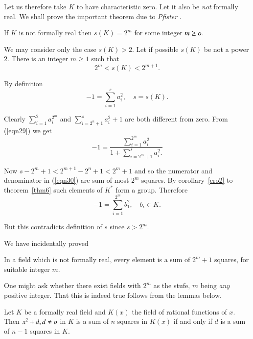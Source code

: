 Let us therefore take $K$ to have characteristic zero. Let it also be
\textit{not} formally real. We shall prove the important theorem due
to \textit{Pfister} \cite{key14}.

\begin{thnm}\label{thnm7}
If $K$ is not formally real then $s(K)=2^{m}$ for some integer $m\geq o$.
\end{thnm}


\begin{Proof}
We may consider only the case $s(K)>2$. Let if possible $s(K)$ be not
a power $2$. There is an integer $m\geq 1$ such that 
$$
2^{m}<s(K)<2^{m+1}.
$$

By definition
\begin{equation}\label{eqn29}
-1=\sum\limits_{i=1}^{s}a^{2}_i,\quad s=s(K).
\end{equation}

Clearly $\sum\limits_{i=1}^{2}a^{2^{m}}_i$ and
$\sum\limits_{i=2^{n}+1}^{s} a^{2}_i+1$ are both different from
zero. From (\ref{eqn29}) we get
\begin{equation}\label{eqn30}
-1=\dfrac{\sum\limits_{i=1}^{2^{m}}a^{2}_i}{1+\sum\limits_{i=2^{m}+1}^{s}a^{2}_i.}
\end{equation}

Now $s-2^{m}+1<2^{m+1}-2^{n}+1<2^{m}+1$ and so the numerator and
denominator in (\ref{eqn30}) are sum of most $2^{m}$ squares. By
corollary~\ref{cro2}  to theorem~\ref{thm6} such elements of $K^{\ast}$ form
a group. Therefore
$$
-1=\sum\limits_{i=1}^{2^{m}}b^{2}_1,\quad b_i\in K.
$$

But this contradicts definition of $s$ since $s>2^{m}$.

We have incidentally proved 
\enprf
\end{Proof}


\begin{thm}\label{thm8}
In a field which is not formally real, every element is a sum of
$2^{m}+1$ squares, for suitable integer $m$.
\end{thm}

One might ask whether there exist fields with $2^{m}$ as the stufe,
$m$ being \textit{any} positive integer. That this is indeed true
follows from the lemmas below.

\begin{lem}\label{lem1}
Let $K$ be a formally real field and $K(x)$ the field of rational
functions of $x$. Then $x^{2}+d, d\neq o$ in $K$ is a sum of $n$
squares in $K(x)$ if and only if $d$ is a sum of $n-1$  squares in $K$.
\end{lem}


